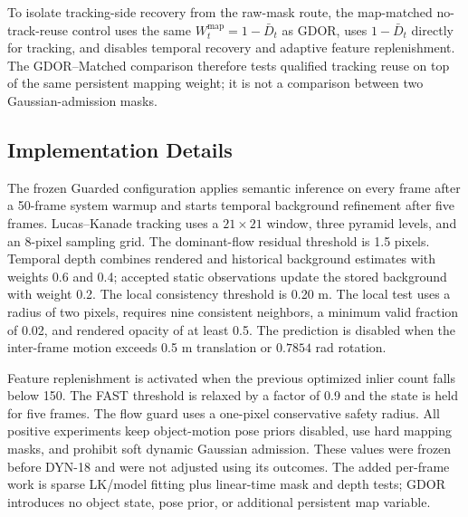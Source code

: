 To isolate tracking-side recovery from the raw-mask route, the map-matched no-track-reuse control uses the same $W_t^{\mathrm{map}}=1-\bar D_t$ as GDOR, uses $1-\bar D_t$ directly for tracking, and disables temporal recovery and adaptive feature replenishment.
The GDOR--Matched comparison therefore tests qualified tracking reuse on top of the same persistent mapping weight; it is not a comparison between two Gaussian-admission masks.

\subsection{Implementation Details}

The frozen Guarded configuration applies semantic inference on every frame after a 50-frame system warmup and starts temporal background refinement after five frames.
Lucas--Kanade tracking uses a $21\times21$ window, three pyramid levels, and an 8-pixel sampling grid.
The dominant-flow residual threshold is 1.5 pixels.
Temporal depth combines rendered and historical background estimates with weights 0.6 and 0.4; accepted static observations update the stored background with weight 0.2.
The local consistency threshold is 0.20 m.
The local test uses a radius of two pixels, requires nine consistent neighbors, a minimum valid fraction of 0.02, and rendered opacity of at least 0.5.
The prediction is disabled when the inter-frame motion exceeds 0.5 m translation or $0.7854$ rad rotation.

Feature replenishment is activated when the previous optimized inlier count falls below 150.
The FAST threshold is relaxed by a factor of 0.9 and the state is held for five frames.
The flow guard uses a one-pixel conservative safety radius.
All positive experiments keep object-motion pose priors disabled, use hard mapping masks, and prohibit soft dynamic Gaussian admission.
These values were frozen before DYN-18 and were not adjusted using its outcomes.
The added per-frame work is sparse LK/model fitting plus linear-time mask and depth tests; GDOR introduces no object state, pose prior, or additional persistent map variable.
